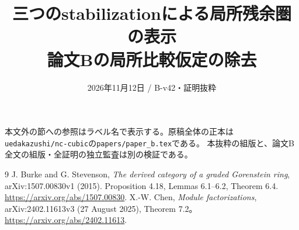 \documentclass[a4paper,11pt]{ltjsarticle}
\title{三つのstabilizationによる局所残余圏の表示\\\large 論文Bの局所比較仮定の除去}
\author{}
\date{2026年11月12日 / B-v42・証明抜粋}
\numberwithin{equation}{section}
\begin{document}
\maketitle
\noindent 本文外の節への参照はラベル名で表示する。原稿全体の正本は
\texttt{uedakazushi/nc-cubic}の\texttt{papers/paper\_b.tex}である。
本抜粋の組版と、論文B全文の組版・全証明の独立監査は別の検証である。

\begin{thebibliography}{9}
J. Burke and G. Stevenson,
\emph{The derived category of a graded Gorenstein ring},
arXiv:1507.00830v1 (2015).
Proposition 4.18, Lemmas 6.1--6.2, Theorem 6.4.
\url{https://arxiv.org/abs/1507.00830}.
X.-W. Chen, \emph{Module factorizations},
arXiv:2402.11613v3 (27 August 2025), Theorem 7.2。
\url{https://arxiv.org/abs/2402.11613}.

\end{thebibliography}
\end{document}
